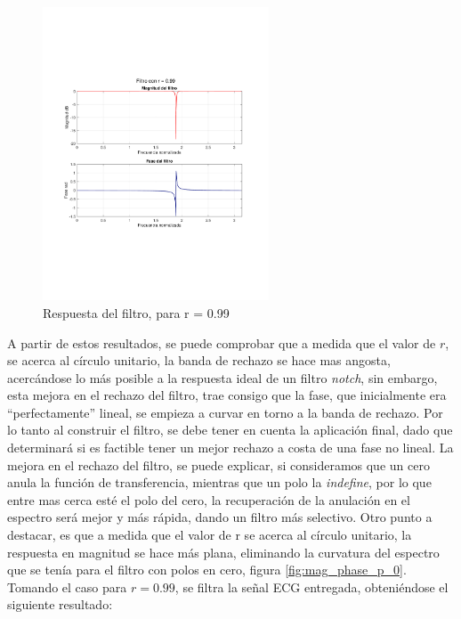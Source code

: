 		\begin{figure}[H]
			\center
			\includegraphics[width=0.6\textwidth,clip, trim = {1.9cm 6.8cm 2.3cm 7cm}]{../plots/ecg_poles_2099.pdf}
			\caption{Respuesta del filtro, para r = 0.99}
			\label{fig:ecg_filter_r_099}
		\end{figure}
		
		A partir de estos resultados, se puede comprobar que a medida que el valor de $r$, se acerca al círculo unitario, la banda de rechazo se hace mas angosta, acercándose lo más posible a la respuesta ideal de un filtro \textit{notch}, sin embargo, esta mejora en el rechazo del filtro, trae consigo que la fase, que inicialmente era ``perfectamente'' lineal, se empieza a curvar en torno a la banda de rechazo. Por lo tanto al construir el filtro, se debe tener en cuenta la aplicación final, dado que determinará si es factible tener un mejor rechazo a costa de una fase no lineal. La mejora en el rechazo del filtro, se puede explicar, si consideramos que un cero anula la función de transferencia, mientras que un polo la \textit{indefine}, por lo que entre mas cerca esté el polo del cero, la recuperación de la anulación en el espectro será mejor y más rápida, dando un filtro más selectivo. Otro punto a destacar, es que a medida que el valor de r se acerca al círculo unitario, la respuesta en magnitud se hace más plana, eliminando la curvatura del espectro que se tenía para el filtro con polos en cero, figura \ref{fig:mag_phase_p_0}. Tomando el caso para $r = 0.99$, se filtra la señal ECG entregada, obteniéndose el siguiente resultado:
		
